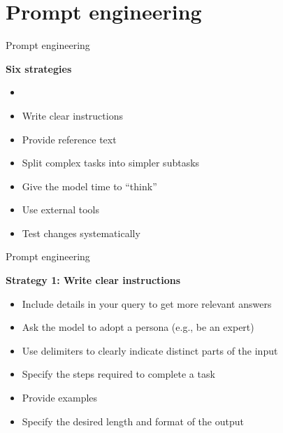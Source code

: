 


\section{Prompt engineering}

\begin{vbframe}{Prompt engineering}

\vfill

\textbf{Six strategies}


\begin{itemize}
\item
\textbf{\href{https://platform.openai.com/docs/guides/prompt-engineering/six-strategies-for-getting-better-results}{}}
	\item Write clear instructions
	\item Provide reference text
	\item Split complex tasks into simpler subtasks
        
	\item Give the model time to ``think''
        
	\item Use external tools
        
	\item Test changes systematically

\end{itemize}



\vfill

\end{vbframe}

\begin{vbframe}{Prompt engineering}

\vfill

\textbf{Strategy 1: Write clear instructions}


\begin{itemize}

\item     Include details in your query to get more relevant
    answers
\item         Ask the model to adopt a persona (e.g., be an expert)
\item             Use delimiters to clearly indicate distinct
    parts of the input
\item         Specify the steps required to complete a task
\item             Provide examples
\item                 Specify the desired length and format of the output

\end{itemize}

\vfill

\end{vbframe}

